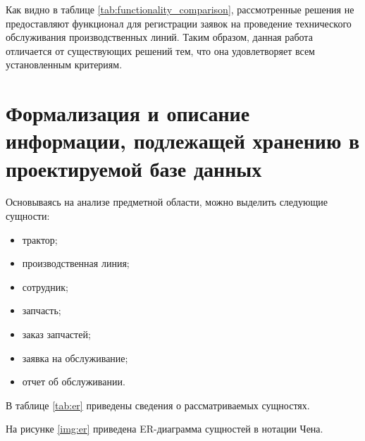 Как видно в таблице \ref{tab:functionality_comparison}, рассмотренные решения не предоставляют функционал для регистрации заявок на проведение технического обслуживания производственных линий. Таким образом, данная работа отличается от существующих решений тем, что она
удовлетворяет всем установленным критериям.


\section{Формализация и описание информации, подлежащей хранению в проектируемой базе
данных}

Основываясь на анализе предметной области, можно выделить следующие сущности:

\begin{itemize}[label=--]
    \item трактор;
    \item производственная линия;
    \item сотрудник;
    \item запчасть;
    \item заказ запчастей;
    \item заявка на обслуживание;
    \item отчет об обслуживании.
\end{itemize}

В таблице \ref{tab:er} приведены сведения о рассматриваемых сущностях.

На рисунке \ref{img:er} приведена ER-диаграмма сущностей в нотации Чена.


